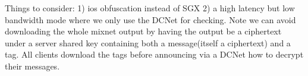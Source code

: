 Things to consider:
1) ios obfuscation instead of SGX
2) a high latency but low bandwidth mode where we only use the DCNet for checking. Note we can avoid downloading the whole mixnet output by having the output be a ciphertext under a server shared key containing both a message(itself a ciphertext) and a tag. All clients download the tags before announcing via a DCNet how to decrypt their messages.






